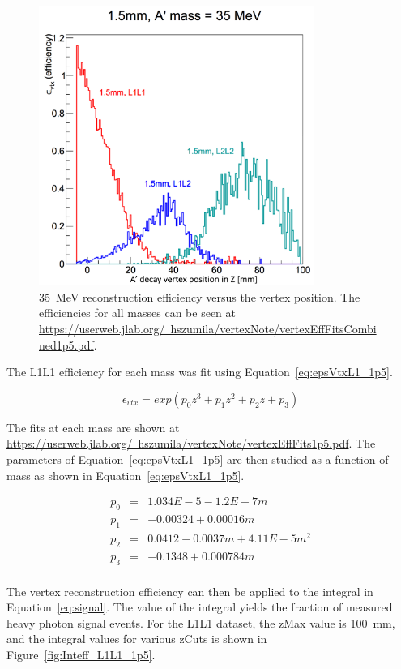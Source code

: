 \documentclass[twoside]{article}
\begin{document}
\begin{figure}[H]
  \centering
     \includegraphics[width=0.8\textwidth]{plots/Effplots_1p5.png}
  \caption{35~MeV reconstruction efficiency versus the vertex position. The efficiencies for all masses can be seen at \href{url}{https://userweb.jlab.org/~hszumila/vertexNote/vertexEffFitsCombined1p5.pdf}. }
  \label{fig:eff1p5mm}
\end{figure} 

The L1L1 efficiency for each mass was fit using Equation~\eqref{eq:epsVtxL1_1p5}. 

\begin{equation}
\label{eq:epsVtxL1_1p5}
\epsilon_{vtx} = exp(p_0z^3+p_1z^2+p_2z+p_3) 
\end{equation}

The fits at each mass are shown at \href{url}{https://userweb.jlab.org/~hszumila/vertexNote/vertexEffFits1p5.pdf}. The parameters of Equation~\eqref{eq:epsVtxL1_1p5} are then studied as a function of mass as shown in Equation~\eqref{eq:epsVtxL1_1p5}.

\begin{eqnarray*}
\label{eq:parsEpsVtxL1_1p5}
p_0 & = & 1.034E-5-1.2E-7m \\
p_1 & = & -0.00324+0.00016m \\
p_2 & = & 0.0412-0.0037m+4.11E-5m^2 \\
p_3 & = & -0.1348+0.000784m \\
\end{eqnarray*}

The vertex reconstruction efficiency can then be applied to the integral in Equation~\eqref{eq:signal}. The value of the integral yields the fraction of measured heavy photon signal events. For the L1L1 dataset, the zMax value is 100~mm, and the integral values for various zCuts is shown in Figure~\ref{fig:Inteff_L1L1_1p5}.
\end{document}
